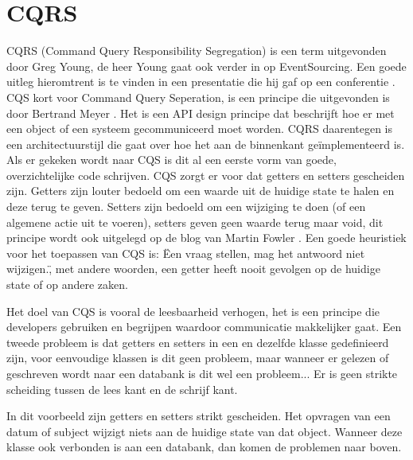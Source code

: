 
\chapter{CQRS}
\label{ch:CQRS}

CQRS (Command Query Responsibility Segregation) is een term uitgevonden door Greg Young, de heer Young gaat ook verder in op EventSourcing. Een goede uitleg hieromtrent is te vinden in een presentatie die hij gaf op een conferentie \autocite{Young2014CQRSandES}. CQS kort voor Command Query Seperation, is een principe die uitgevonden is door Bertrand Meyer \autocite{Meyer1988}. Het is een API design principe dat beschrijft hoe er met een object of een systeem gecommuniceerd moet worden. CQRS daarentegen is een architectuurstijl die gaat over hoe het aan de binnenkant geïmplementeerd is. Als er gekeken wordt naar CQS is dit al een eerste vorm van goede, overzichtelijke code schrijven. CQS zorgt er voor dat getters en setters gescheiden zijn. Getters zijn louter bedoeld om een waarde uit de huidige state te halen en deze terug te geven. Setters zijn bedoeld om een wijziging te doen (of een algemene actie uit te voeren), setters geven geen waarde terug maar void, dit principe wordt ook uitgelegd op de blog van Martin Fowler \autocite{Fowler2005CQS}. Een goede heuristiek voor het toepassen van CQS is: \"Een vraag stellen, mag het antwoord niet wijzigen.\", met andere woorden, een getter heeft nooit gevolgen op de huidige state of op andere zaken.

Het doel van CQS is vooral de leesbaarheid verhogen, het is een principe die developers gebruiken en begrijpen waardoor communicatie makkelijker gaat.
Een tweede probleem is dat getters en setters in een en dezelfde klasse gedefinieerd zijn, voor eenvoudige klassen is dit geen probleem, maar wanneer er gelezen of geschreven wordt naar een databank is dit wel een probleem... Er is geen strikte scheiding tussen de lees kant en de schrijf kant.


In dit voorbeeld zijn getters en setters strikt gescheiden. Het opvragen van een datum of subject wijzigt niets aan de huidige state van dat object. Wanneer deze klasse ook verbonden is aan een databank, dan komen de problemen naar boven.

